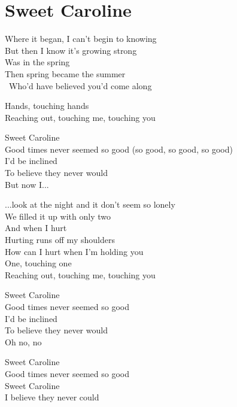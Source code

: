 \section{Sweet Caroline}
Where it began, I can't begin to knowing\\
But then I know it's growing strong\\
Was in the spring\\
Then spring became the summer\\\
Who'd have believed you'd come along

Hands, touching hands\\
Reaching out, touching me, touching you

Sweet Caroline\\
Good times never seemed so good (so good, so good, so good)\\
I'd be inclined\\
To believe they never would\\
But now I...

...look at the night and it don't seem so lonely\\
We filled it up with only two\\
And when I hurt\\
Hurting runs off my shoulders\\
How can I hurt when I'm holding you\\

One, touching one\\
Reaching out, touching me, touching you

Sweet Caroline\\
Good times never seemed so good\\
I'd be inclined\\
To believe they never would\\
Oh no, no

Sweet Caroline\\
Good times never seemed so good\\
Sweet Caroline\\
I believe they never could
